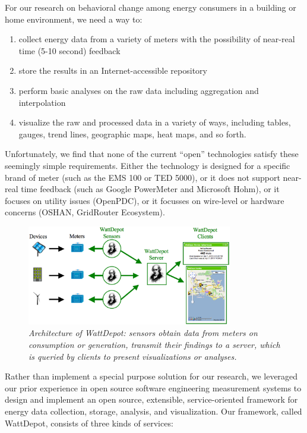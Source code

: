 \documentclass[conference]{IEEEtran}
\begin{document}
For our research on behavioral change among energy consumers in a building
or home environment, we need a way to: 
\begin{enumerate}
	\item collect energy data from a
variety of meters with the possibility of near-real time (5-10 second)
feedback
	\item store the results in an Internet-accessible repository
	\item perform basic analyses on the raw data including aggregation and
interpolation
	\item visualize the raw and processed data in a variety of
ways, including tables, gauges, trend lines, geographic maps, heat maps, and
so forth.
\end{enumerate}

Unfortunately, we find that none of the current ``open'' technologies
satisfy these seemingly simple requirements. Either the technology is
designed for a specific brand of meter (such as the EMS 100 or TED 5000), or it does not
support near-real time feedback (such as Google PowerMeter and Microsoft
Hohm), or it focuses on utility issues (OpenPDC), or it focusses on
wire-level or hardware concerns (OSHAN, GridRouter Ecosystem).


\begin{figure}[!th]
  \center
  \includegraphics[width=0.8\textwidth]{architecture.eps}
  \caption{\em \small Architecture of WattDepot: sensors obtain data from
    meters on consumption or generation, transmit their findings to a
    server, which is queried by clients to present visualizations or analyses.}
  \label{fig:architecture}
\end{figure} 

Rather than implement a special purpose solution for our research, we
leveraged our prior experience in open source software
engineering measurement systems to design and implement an open source,
extensible, service-oriented framework for energy data collection, storage,
analysis, and visualization. Our framework, called WattDepot, consists of
three kinds of services:
\end{document}
